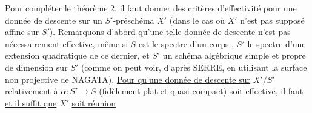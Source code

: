 Pour compléter le théorème 2, il faut donner des critères d'effectivité pour une donnée de descente sur un $S'$-préschéma  $X'$ (dans le cas où $X'$ n'est pas supposé affine sur $S'$). Remarquons d'abord qu'\uline{une telle donnée de descente n'est pas nécessairement effective}, même si $S$ est le spectre d'un corps   , $S'$ le spectre d'une extension quadratique  de ce dernier, et $S'$  un schéma algébrique simple et propre de dimension  sur $S'$ (comme on peut voir, d'après SERRE, en utilisant la surface non projective de NAGATA).  \uline{Pour qu'une donnée de descente sur} $X'/S'$ \uline{relativement à} $\alpha:S'\longrightarrow S$  (\uline{fidèlement plat et quasi-compact}) \uline{soit effective}, \uline{il faut et il suffit que} $X'$ \uline{soit réunion}
